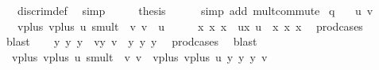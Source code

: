 \begin{isabellebody}
\ {}\ {}\ discrim{\isacharunderscore}{\kern0pt}def\ \isamarkupfalse%
\ simp\isanewline
\ \ \isamarkupfalse%
\ \isamarkupfalse%
\ {\isacharquery}{\kern0pt}thesis\ \isamarkupfalse%
\ {}\ \ \isamarkupfalse%
\ {\isacharparenleft}{\kern0pt}simp\ add{\isacharcolon}{\kern0pt}\ mult{\isachardot}{\kern0pt}commute{\isacharparenright}{\kern0pt}\isanewline
{}\isamarkupfalse%
%
\endisatagproof
{\isafoldproof}%
%
\isadelimproof
\isanewline
%
\endisadelimproof
\isanewline
\isanewline
\isanewline
{}\isamarkupfalse%
\ q{\isacharcolon}{\kern0pt}\isanewline
\ \ \ u\ v\isanewline
\ \ \ {\isachardoublequoteopen}vplus\ {\isacharparenleft}{\kern0pt}vplus\ u\ {\isacharparenleft}{\kern0pt}smult\ {\isacharparenleft}{\kern0pt}{\isacharminus}{\kern0pt}{}{\isacharparenright}{\kern0pt}\ v{\isacharparenright}{\kern0pt}{\isacharparenright}{\kern0pt}\ v\ {\isacharequal}{\kern0pt}\ u{\isachardoublequoteclose}\isanewline
%
\isadelimproof
%
\endisadelimproof
%
\isatagproof
{}\isamarkupfalse%
\ {\isacharminus}{\kern0pt}\isanewline
\ \ \isamarkupfalse%
\ x{}\ x{}\ x{}\ \ ux{\isacharcolon}{\kern0pt}\ {\isachardoublequoteopen}u\ {\isacharequal}{\kern0pt}\ {\isacharparenleft}{\kern0pt}x{}{\isacharcomma}{\kern0pt}\ x{}{\isacharcomma}{\kern0pt}\ x{}{\isacharparenright}{\kern0pt}{\isachardoublequoteclose}\ \isamarkupfalse%
\ prod{\isacharunderscore}{\kern0pt}cases{}\ \isamarkupfalse%
\ blast\isanewline
\ \ \isamarkupfalse%
\ y{}\ y{}\ y{}\ \ vy{\isacharcolon}{\kern0pt}\ {\isachardoublequoteopen}v\ {\isacharequal}{\kern0pt}\ {\isacharparenleft}{\kern0pt}y{}{\isacharcomma}{\kern0pt}\ y{}{\isacharcomma}{\kern0pt}\ y{}{\isacharparenright}{\kern0pt}{\isachardoublequoteclose}\ \isamarkupfalse%
\ prod{\isacharunderscore}{\kern0pt}cases{}\ \isamarkupfalse%
\ blast\isanewline
\ \ \isamarkupfalse%
\ {}{\isacharcolon}{\kern0pt}\ {\isachardoublequoteopen}vplus\ {\isacharparenleft}{\kern0pt}vplus\ u\ {\isacharparenleft}{\kern0pt}smult\ {\isacharparenleft}{\kern0pt}{\isacharminus}{\kern0pt}{}{\isacharparenright}{\kern0pt}\ v{\isacharparenright}{\kern0pt}{\isacharparenright}{\kern0pt}\ v\ {\isacharequal}{\kern0pt}\ vplus\ {\isacharparenleft}{\kern0pt}vplus\ u\ {\isacharparenleft}{\kern0pt}{\isacharminus}{\kern0pt}y{}{\isacharcomma}{\kern0pt}\ {\isacharminus}{\kern0pt}y{}{\isacharcomma}{\kern0pt}\ {\isacharminus}{\kern0pt}y{}{\isacharparenright}{\kern0pt}{\isacharparenright}{\kern0pt}\ v{\isachardoublequoteclose}\ \isamarkupfalse%

\end{isabellebody}
